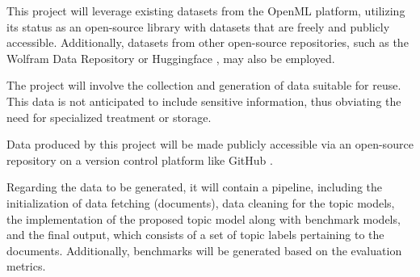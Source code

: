\documentclass{article}
\begin{document}



This project will leverage existing datasets from the OpenML platform, utilizing its status as an open-source library with datasets that are freely and publicly accessible. Additionally, datasets from other open-source repositories, such as the Wolfram Data Repository \cite{noauthor_wolfram_nodate} or Huggingface \cite{noauthor_hugging_2024}, may also be employed.

The project will involve the collection and generation of data suitable for reuse. This data is not anticipated to include sensitive information, thus obviating the need for specialized treatment or storage.

Data produced by this project will be made publicly accessible via an open-source repository on a version control platform like GitHub \cite{noauthor_github_nodate}.

Regarding the data to be generated, it will contain a pipeline, including the initialization of data fetching (documents), data cleaning for the topic models, the implementation of the proposed topic model along with benchmark models, and the final output, which consists of a set of topic labels pertaining to the documents. Additionally, benchmarks will be generated based on the evaluation metrics.
\end{document}
